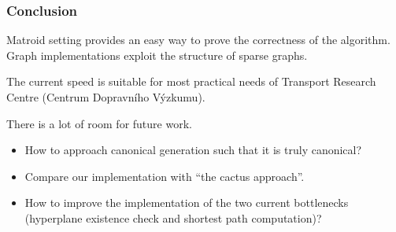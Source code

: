\documentclass[10pt]{beamer}
\begin{document}
\begin{frame}
	\frametitle{Conclusion}

	Matroid setting provides an easy way to prove the correctness of the algorithm.
	Graph implementations exploit the structure of sparse graphs.

	\medskip

	The current speed is suitable for most practical needs of Transport Research Centre (Centrum Dopravního Výzkumu).

	\bigskip

	There is a lot of room for future work.
	\begin{itemize}
		\item How to approach canonical generation such that it is truly canonical?
		\item Compare our implementation with ``the cactus approach''.
		\item How to improve the implementation of the two current bottlenecks
			(hyperplane existence check and shortest path computation)?
	\end{itemize}

\end{frame}
\end{document}
